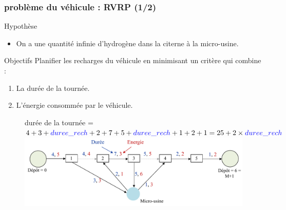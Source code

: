 \documentclass[hyperref={bookmarks=false},aspectratio=169]{beamer}
\begin{document}



\begin{frame}

\frametitle{problème du véhicule : RVRP (1/2)}

\begin{itemize}

		\begin{block}{Hypothèse}%
		\begin{itemize}
 \item  On a une quantité infinie d'hydrogène dans la citerne à la micro-usine.

		\end{itemize}


 \end{block}
 \pause
   \space 
    \begin{alertblock}{Objectifs}%
    Planifier les recharges du véhicule en minimisant un critère qui combine : 
\begin{enumerate}
 \item La durée de la tournée.
  \item L'énergie consommée par le véhicule.
 \end{enumerate}
 \end{alertblock}
  
\pause

\end{itemize}
\begin{figure}
    \centering
    \tiny{durée de la tournée = $4+3+\textcolor{blue}{duree\_rech}+2+7+5+\textcolor{blue}{duree\_rech}+1+2+1=25+2\times \textcolor{blue}{duree\_rech}$ }
    \includegraphics[width=12cm]{./figures/Trip.pdf}
    \label{fig:dept}
\end{figure}

\end{frame}
\end{document}
